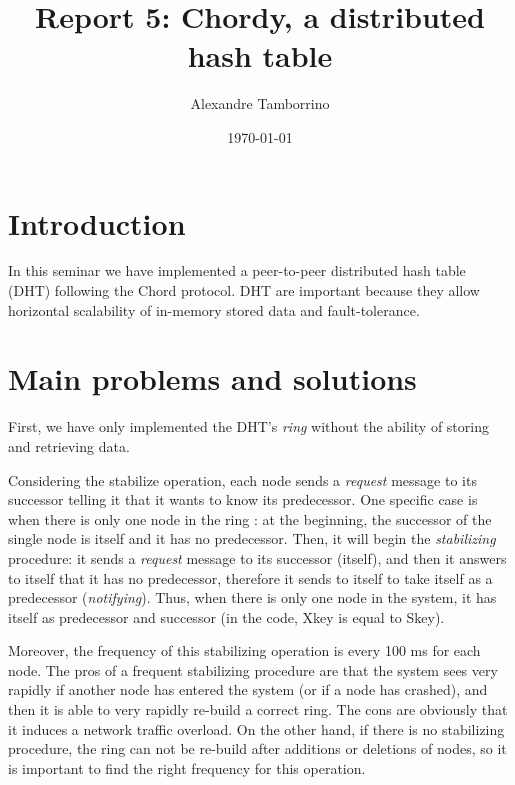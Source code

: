 \documentclass[a4paper, 11pt]{article}
\title{Report 5: Chordy, a distributed hash table}
\author{Alexandre Tamborrino}
\date{\today{}}
\begin{document}
\maketitle

\section{Introduction}

In this seminar we have implemented a peer-to-peer distributed hash table (DHT) following the Chord protocol. DHT are important because they allow horizontal scalability of in-memory stored data and fault-tolerance.


\section{Main problems and solutions}

First, we have only implemented the DHT's \textit{ring} without the ability of storing and retrieving data. 

Considering the stabilize operation, each node sends a \textit{request} message to its successor telling it that it wants to know its predecessor. One specific case is when there is only one node in the ring : at the beginning, the successor of the single node is itself and it has no predecessor. Then, it will begin the \textit{stabilizing} procedure: it sends a \textit{request} message to its successor (itself), and then it answers to itself that it has no predecessor, therefore it sends to itself to take itself as a predecessor (\textit{notifying}). Thus, when there is only one node in the system, it has itself as predecessor and successor (in the code, Xkey is equal to Skey).

Moreover, the frequency of this stabilizing operation is every 100 ms for each node. The pros of a frequent stabilizing procedure are that the system sees very rapidly if another node has entered the system (or if a node has crashed), and then it is able to very rapidly re-build a correct ring. The cons are obviously that it induces a network traffic overload. On the other hand, if there is no stabilizing procedure, the ring can not be re-build after additions or deletions of nodes, so it is important to find the right frequency for this operation.
\end{document}
